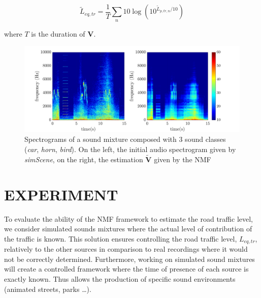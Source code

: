 \documentclass{article}
\begin{document}
\begin{sloppy}
\begin{equation}\label{eq:Leq}
\tilde{L}_{eq,tr} = \frac{1}{T} \sum_{n} 10\log \left(10^{\tilde{L}_{p,tr,n}/10}\right)
\end{equation}

where $T$ is the duration of $\mathbf{V}$.\\

\begin{figure}[th!]
\centering
\includegraphics[width=\textwidth]{images/bvak_Sc2_Vapprox_spectre_Euc.pdf}
\caption{Spectrograms of a sound mixture composed with 3 sound classes (\textit{car}, \textit{horn}, \textit{bird}). On the left, the initial audio spectrogram given by \textit{simScene}, on the right, the estimation $\mathbf{\tilde{V}}$ given by the NMF}
\label{fig:spectrogram}
\end{figure}

\section{EXPERIMENT}\label{sec:experiment}


To evaluate the ability of the NMF framework to estimate the road traffic level, we consider simulated sounds mixtures where the actual level of contribution of the traffic is known. This solution ensures controlling the road traffic level, $L_{eq,tr}$, relatively to the other sources in comparison to real recordings where it would not be correctly determined. Furthermore, working on simulated sound mixtures will create a controlled framework where the time of presence of each source is exactly known. Thus allows the production of specific sound environments (animated streets, parks \dots). 


\end{sloppy}
\end{document}
